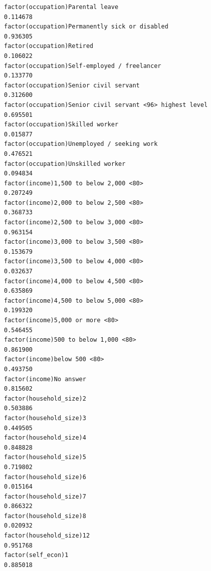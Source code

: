 \documentclass[
]{article}
\begin{document}
\begin{table}
\begin{minipage}[t]{\linewidth}
{\begin{verbatim}
factor(occupation)Parental leave                                                  0.114678
factor(occupation)Permanently sick or disabled                                    0.936305
factor(occupation)Retired                                                         0.106022
factor(occupation)Self-employed / freelancer                                      0.133770
factor(occupation)Senior civil servant                                            0.312600
factor(occupation)Senior civil servant <96> highest level                         0.695501
factor(occupation)Skilled worker                                                  0.015877
factor(occupation)Unemployed / seeking work                                       0.476521
factor(occupation)Unskilled worker                                                0.094834
factor(income)1,500 to below 2,000 <80>                                           0.207249
factor(income)2,000 to below 2,500 <80>                                           0.368733
factor(income)2,500 to below 3,000 <80>                                           0.963154
factor(income)3,000 to below 3,500 <80>                                           0.153679
factor(income)3,500 to below 4,000 <80>                                           0.032637
factor(income)4,000 to below 4,500 <80>                                           0.635869
factor(income)4,500 to below 5,000 <80>                                           0.199320
factor(income)5,000 or more <80>                                                  0.546455
factor(income)500 to below 1,000 <80>                                             0.861900
factor(income)below 500 <80>                                                      0.493750
factor(income)No answer                                                           0.815602
factor(household_size)2                                                           0.503886
factor(household_size)3                                                           0.449505
factor(household_size)4                                                           0.848828
factor(household_size)5                                                           0.719802
factor(household_size)6                                                           0.015164
factor(household_size)7                                                           0.866322
factor(household_size)8                                                           0.020932
factor(household_size)12                                                          0.951768
factor(self_econ)1                                                                0.885018

\end{verbatim}}
\end{minipage}
\end{table}
\end{document}
